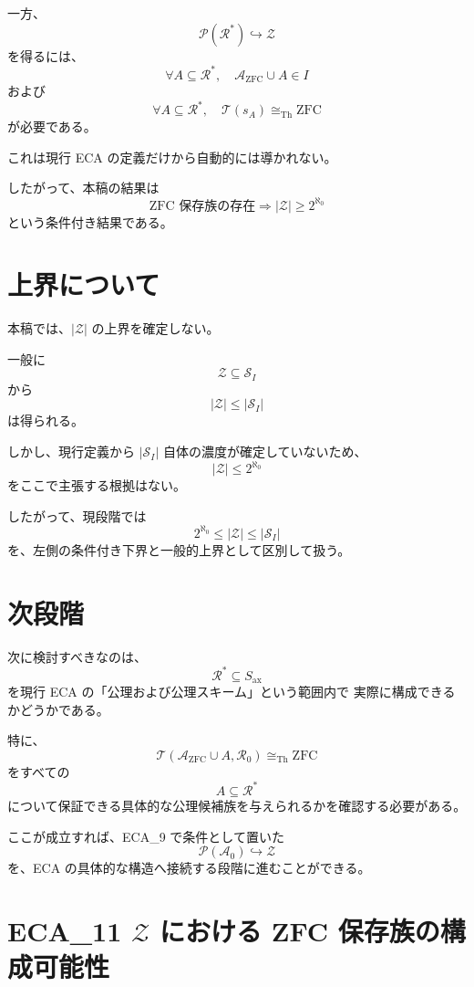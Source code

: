 \documentclass[a4paper,11pt]{article}
\newcommand{\Solver}{\mathcal{S}}
\newcommand{\Ax}{S_{\mathrm{ax}}}
\begin{document}
一方、
\[
\mathcal{P}(\mathcal{R}^*)\hookrightarrow\mathcal{Z}
\]
を得るには、
\[
\forall A\subseteq\mathcal{R}^*,
\quad
\mathcal{A}_{\mathrm{ZFC}}\cup A\in I
\]
および
\[
\forall A\subseteq\mathcal{R}^*,
\quad
\mathcal{T}(s_A)\cong_{\mathrm{Th}}\mathrm{ZFC}
\]
が必要である。

これは現行 ECA の定義だけから自動的には導かれない。

したがって、本稿の結果は
\[
\boxed{
\text{ZFC 保存族の存在}
\Longrightarrow
|\mathcal{Z}|\geq2^{\aleph_0}
}
\]
という条件付き結果である。

\section{上界について}

本稿では、$|\mathcal{Z}|$ の上界を確定しない。

一般に
\[
\mathcal{Z}\subseteq\Solver_I
\]
から
\[
|\mathcal{Z}|\leq|\Solver_I|
\]
は得られる。

しかし、現行定義から $|\Solver_I|$ 自体の濃度が確定していないため、
\[
|\mathcal{Z}|\leq2^{\aleph_0}
\]
をここで主張する根拠はない。

したがって、現段階では
\[
\boxed{
2^{\aleph_0}\leq|\mathcal{Z}|\leq|\Solver_I|
}
\]
を、左側の条件付き下界と一般的上界として区別して扱う。

\section{次段階}

次に検討すべきなのは、
\[
\mathcal{R}^*\subseteq\Ax
\]
を現行 ECA の「公理および公理スキーム」という範囲内で
実際に構成できるかどうかである。

特に、
\[
\mathcal{T}
\left(
\mathcal{A}_{\mathrm{ZFC}}\cup A,\mathcal{R}_0
\right)
\cong_{\mathrm{Th}}\mathrm{ZFC}
\]
をすべての
\[
A\subseteq\mathcal{R}^*
\]
について保証できる具体的な公理候補族を与えられるかを確認する必要がある。

ここが成立すれば、ECA_9 で条件として置いた
\[
\mathcal{P}(\mathcal{A}_0)\hookrightarrow\mathcal{Z}
\]
を、ECA の具体的な構造へ接続する段階に進むことができる。




\section{ECA_11 $\mathcal{Z}$ における ZFC 保存族の構成可能性}
\end{document}
